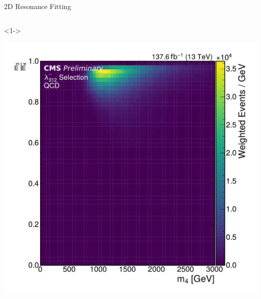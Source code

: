 \documentclass[]{beamer}
\begin{document}
\begin{frame}{2D Resonance Fitting}
\begin{columns}[t]
\begin{column}{0.3\textwidth}
      \begin{onlyenv}<1->
        \begin{center}
          \includegraphics[width=\thiswidth\textwidth]{figures/ratio_m14_vs_m13_Skim_QCDInclusive2018.pdf}\\

\end{center}
\end{onlyenv}
\end{column}
\end{columns}
\end{frame}
\end{document}
